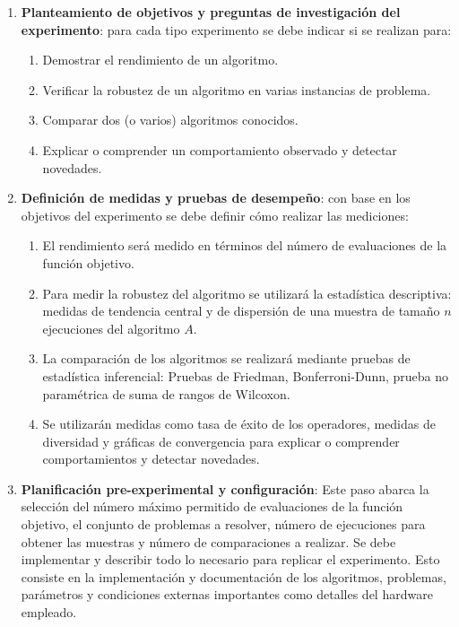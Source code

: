 \begin{enumerate}[label=Paso \arabic*. , leftmargin=2cm]
	\item \textbf{ Planteamiento de objetivos y preguntas de investigación del experimento}: para cada tipo experimento se debe indicar si se realizan para:
	\begin{enumerate}
		\item Demostrar el rendimiento de un algoritmo.
		\item Verificar la robustez de un algoritmo en varias instancias de problema.
		\item Comparar dos (o varios) algoritmos conocidos.
		\item Explicar o comprender un comportamiento observado y detectar novedades. 
	\end{enumerate}
	\item \textbf{Definición de medidas y pruebas de desempeño}: con base en los objetivos del experimento se debe definir cómo realizar las mediciones:
	\begin{enumerate}
		\item El rendimiento será medido en términos del número de evaluaciones de la función objetivo.
		\item Para medir la robustez del algoritmo se utilizará la estadística descriptiva: medidas de tendencia central y de dispersión de una muestra de tamaño $n$ ejecuciones del algoritmo $A$.
		\item La comparación de los algoritmos se realizará mediante pruebas de estadística inferencial: Pruebas de Friedman, Bonferroni-Dunn, prueba no paramétrica de suma de rangos de Wilcoxon.
		\item Se utilizarán medidas como tasa de éxito de los operadores, medidas de diversidad y gráficas de convergencia para explicar o comprender comportamientos y detectar novedades.
	\end{enumerate}
	\item \textbf{Planificación pre-experimental y configuración}: Este paso abarca la selección del número máximo permitido de evaluaciones de la función objetivo, el conjunto de problemas a resolver, número de ejecuciones para obtener las muestras y número de comparaciones a realizar. Se debe implementar y describir todo lo necesario para replicar el experimento. Esto consiste en la implementación y documentación de los algoritmos, problemas, parámetros y condiciones externas importantes como detalles del hardware empleado.
	

\end{enumerate}
